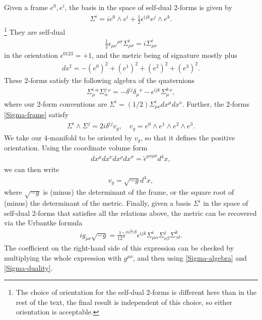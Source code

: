 \documentclass[10pt]{report}
\newcommand{\urb}[0]{Urbantke}
\theoremstyle{definition}
\newcommand{\im}{i}
\begin{document}
Given a frame $e^0, e^i$, the basis in the space of self-dual 2-forms is given by
\begin{align}\label{Sigma-frame}
\Sigma^i = \im e^0 \wedge e^i + \frac{1}{2} \epsilon^{ijk} e^j\wedge e^k.
\end{align}
\footnote{The choice of orientation for the self-dual 2-forms is different here than in the rest of the text, the final result is independent of this choice, so either orientation is acceptable.} They are self-dual 
\begin{align}\label{Sigma-duality}
\frac{1}{2} \epsilon_{\mu\nu}{}^{\rho\sigma}\Sigma^i_{\rho\sigma} =  \im \Sigma^i_{\mu\nu}
\end{align}
in the orientation $\epsilon^{0123}=+1$, and the metric being of signature mostly plus
\begin{align}
ds^2 = - (e^0)^2+(e^1)^2+(e^2)^2+(e^3)^2.
\end{align}
These 2-forms satisfy the following algebra of the quaternions
\begin{align}\label{Sigma-algebra}
\Sigma^i_\mu{}^\alpha \Sigma^j_\alpha{}^\nu = - \delta^{ij} \delta_\mu{}^\nu - \epsilon^{ijk} \Sigma^k_\mu{}^\nu,
\end{align}
where our 2-form conventions are $\Sigma^i= (1/2)\Sigma^i_{\mu\nu} dx^\mu dx^\nu$. Further, the 2-forms \cref{Sigma-frame} satisfy
\begin{align}\label{Sigma-Sigma}
    \Sigma^i \wedge \Sigma^j =  2\im \delta^{ij} v_g, \quad v_g = e^0\wedge e^1\wedge e^2\wedge e^3.
\end{align}
We take our 4-manifold to be oriented by $v_g$, so that it defines the positive orientation. Using the coordinate volume form
\begin{align}
    dx^\mu dx^\nu dx^\rho dx^\sigma = \tilde{\epsilon}^{\mu\nu\rho\sigma} d^4x,
\end{align}
we can then write
\begin{align}
v_g = \sqrt{-g} d^4x,
\end{align}
where $\sqrt{-g}$ is (minus) the determinant of the frame, or the square root of (minus) the determinant of the metric. Finally, given a basis $\Sigma^i$ in the space of self-dual 2-forms that satisfies all the relations above, the metric can be recovered via the \urb{} formula
\begin{align}\label{metric-Sigma}
\im g_{\mu\nu}  \sqrt{-g} = \frac{1}{12} \tilde{\epsilon}^{\alpha\beta\gamma\delta} \epsilon^{ijk} \Sigma^i_{\mu\alpha} \Sigma^j_{\nu\beta}  \Sigma^k_{\gamma\delta}.
\end{align}
The coefficient on the right-hand side of this expression can be checked by multiplying the whole expression with $g^{\mu\nu}$, and then using \cref{Sigma-algebra} and \cref{Sigma-duality}. 
\end{document}
